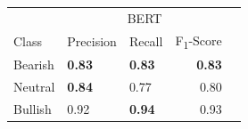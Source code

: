 \documentclass[11pt, a4paper]{article}
\begin{document}
\begin{table}[!htb]
\begin{tabular}{lllrr}
        \bottomrule
    \end{tabular}
    \begin{tabular}{lllrr}
                                        & \multicolumn{3}{c}{BERT} \\
                                        \cmidrule{2-4}
                            Class       & Precision     & Recall    & F\textsubscript{1}-Score \\
            \midrule
            \multirow{1}{*}{Bearish}       & \textbf{0.83}          & \textbf{0.83}      & \textbf{0.83}                      \\
            \midrule
            \multirow{1}{*}{Neutral}       & \textbf{0.84}         & 0.77      & 0.80                      \\
            \midrule
            \multirow{1}{*}{Bullish}       & 0.92          & \textbf{0.94}      & 0.93                      \\
        \bottomrule
    \end{tabular}

\end{table}
\newpage
\end{document}
